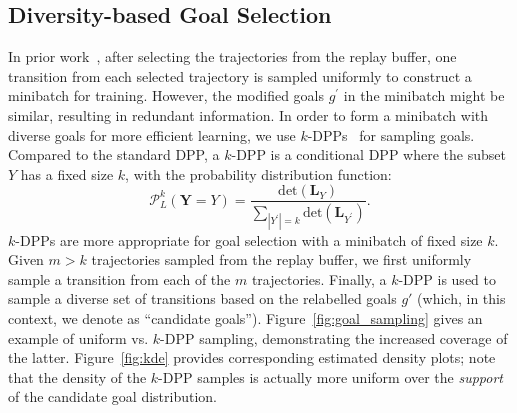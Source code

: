 \subsection{Diversity-based Goal Selection}
In prior work~\cite{andrychowicz2017hindsight,zhao2018energy}, after selecting the trajectories from the replay buffer, one transition from each selected trajectory is sampled uniformly to construct a minibatch for training. However, the modified goals $g^{\prime}$ in the minibatch might be similar, resulting in redundant information. In order to form a minibatch with diverse goals for more efficient learning, we use $k$-DPPs~\cite{kulesza2011k} for sampling goals. Compared to the standard DPP, a $k$-DPP is a conditional DPP where the subset $Y$ has a fixed size $k$, with the probability distribution function:
\begin{equation}
    \mathcal{P}_{L}^{k}(\mathbf{Y}=Y) = \frac{\text{det}(\mathbf{L}_{Y})}{\sum_{|Y^{\prime}|=k} \text{det}(\mathbf{L}_{Y^{\prime}})}.
\end{equation}
$k$-DPPs are more appropriate for goal selection with a minibatch of fixed size $k$. Given $m > k$ trajectories sampled from the replay buffer, we first uniformly sample a transition from each of the $m$ trajectories. Finally, a $k$-DPP is used to sample a diverse set of transitions based on the relabelled goals $g'$ (which, in this context, we denote as ``candidate goals''). Figure~\ref{fig:goal_sampling} gives an example of uniform vs. $k$-DPP sampling, demonstrating the increased coverage of the latter. Figure~\ref{fig:kde} provides corresponding estimated density plots; note that the density of the $k$-DPP samples is actually more uniform over the \textit{support} of the candidate goal distribution.
